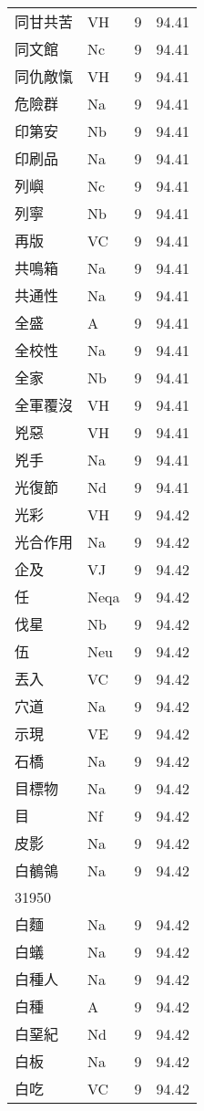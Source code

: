 \documentclass[twocolumn]{book}
\begin{document}
\begin{supertabular}{llrr}
同甘共苦 & VH & 9 &  94.41\\
同文館 & Nc & 9 &  94.41\\
同仇敵愾 & VH & 9 &  94.41\\
危險群 & Na & 9 &  94.41\\
印第安 & Nb & 9 &  94.41\\
印刷品 & Na & 9 &  94.41\\
列嶼 & Nc & 9 &  94.41\\
列寧 & Nb & 9 &  94.41\\
再版 & VC & 9 &  94.41\\
共鳴箱 & Na & 9 &  94.41\\
共通性 & Na & 9 &  94.41\\
全盛 & A & 9 &  94.41\\
全校性 & Na & 9 &  94.41\\
全家 & Nb & 9 &  94.41\\
全軍覆沒 & VH & 9 &  94.41\\
兇惡 & VH & 9 &  94.41\\
兇手 & Na & 9 &  94.41\\
光復節 & Nd & 9 &  94.41\\
光彩 & VH & 9 &  94.42\\
光合作用 & Na & 9 &  94.42\\
企及 & VJ & 9 &  94.42\\
任 & Neqa & 9 &  94.42\\
伐星 & Nb & 9 &  94.42\\
伍 & Neu & 9 &  94.42\\
丟入 & VC & 9 &  94.42\\
穴道 & Na & 9 &  94.42\\
示現 & VE & 9 &  94.42\\
石橋 & Na & 9 &  94.42\\
目標物 & Na & 9 &  94.42\\
目 & Nf & 9 &  94.42\\
皮影 & Na & 9 &  94.42\\
白鶺鴒 & Na & 9 &  94.42\\
31950\\
白麵 & Na & 9 &  94.42\\
白蟻 & Na & 9 &  94.42\\
白種人 & Na & 9 &  94.42\\
白種 & A & 9 &  94.42\\
白堊紀 & Nd & 9 &  94.42\\
白板 & Na & 9 &  94.42\\
白吃 & VC & 9 &  94.42\\

\end{supertabular}
\end{document}
